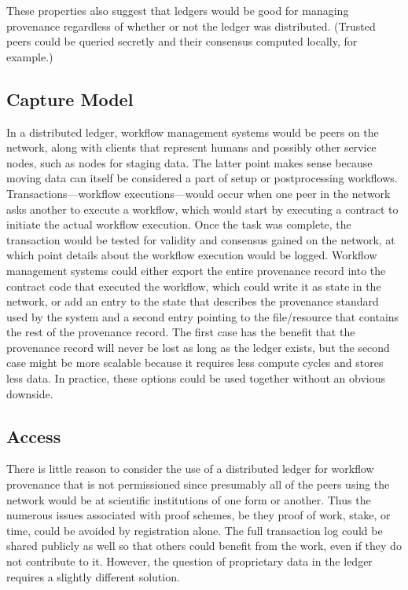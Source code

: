 \documentclass[sigconf]{acmart}
\begin{document}
These properties also suggest that ledgers would be good for managing provenance regardless of whether or not the ledger was distributed. (Trusted peers could be queried secretly and their consensus computed locally, for example.)

\subsection{Capture Model}
In a distributed ledger, workflow management systems would be peers on the network, along with clients that represent humans and possibly other service nodes, such as nodes for staging data. The latter point makes sense because moving data can itself be considered a part of setup or postprocessing workflows. Transactions---workflow executions---would occur when one peer in the network asks another to execute a workflow, which would start by executing a contract to initiate the actual workflow execution. Once the task was complete, the transaction would be tested for validity and consensus gained on the network, at which point details about the workflow execution would be logged. Workflow management systems could either export the entire provenance record into the contract code that executed the workflow, which could write it as state in the network, or add an entry to the state that describes the provenance standard used by the system and a second entry pointing to the file/resource that contains the rest of the provenance record. The first case has the benefit that the provenance record will never be lost as long as the ledger exists, but the second case might be more scalable because it requires less compute cycles and stores less data. In practice, these options could be used together without an obvious downside.

\subsection{Access}
There is little reason to consider the use of a distributed ledger for workflow provenance that is not permissioned since presumably all of the peers using the network would be at scientific institutions of one form or another. Thus the numerous issues associated with proof schemes, be they proof of work, stake, or time, could be avoided by registration alone. The full transaction log could be shared publicly as well so that others could benefit from the work, even if they do not contribute to it. However, the question of proprietary data in the ledger requires a slightly different solution.
\end{document}
